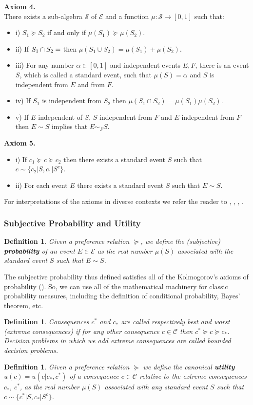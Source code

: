 \documentclass[11pt]{article}
\theoremstyle{plain}
\newtheorem{defi}[teo]{Definition}
\begin{document}
	\textbf{Axiom 4.}\\
	There exists a sub-algebra $\mathcal{S}$ of $\mathcal{E}$ and a function $\mu : \mathcal{S} \to [0,1]$ such that:
	\begin{itemize}
	\item i) $S_1 \succeq S_2$ if and only if $\mu(S_1) \succeq \mu(S_2)$.
	\item ii) If $S_1 \cap S_2 = \empty$ then $\mu(S_1 \cup S_2) = \mu(S_1) + \mu(S_2)$.
	\item iii) For any number $\alpha \in [0,1]$ and independent events $E,F$, there is an event $S$, which is called a standard event, such that $\mu(S)=\alpha$ and $S$ is independent from $E$ and from $F$.
	\item iv) If $S_1$ is independent from $S_2$ then $\mu(S_1 \cap S_2)=\mu(S_1)\mu(S_2)$.
	\item v) If $E$ independent of $S$, $S$ independent from $F$ and $E$ independent from $F$ then $E \sim S$ implies that $E \sim_F S$.
	\end{itemize}
	
	\textbf{Axiom 5.}
	\begin{itemize}
	\item i) If $c_1 \succeq c \succeq c_2$ then there exists a standard event $S$ such that $c \sim \{ c_2 | S, c_1 | S^c \}$.
	\item ii) For each event $E$ there exists a standard event $S$ such that $E \sim S$.
	\end{itemize}
	
	For interpretations of the axioms in diverse contexts we refer the reader to \cite{bernardo2000bayesian}, \cite{binmore2008rational}, \cite{gilboa2009decision}, \cite{wakker2010prospect}.
	\subsubsection{Subjective Probability and Utility}
	\begin{defi}
	Given a preference relation $\succeq$, we define the (subjective) \textbf{probability} of an event $E \in \mathcal{E}$ as the real number $\mu(S)$ associated with the standard event $S$ such that $E \sim S$.
	\end{defi}
	The subjective probability thus defined satisfies all of the Kolmogorov's axioms of probability (\cite{bernardo2000bayesian}). So, we can use all of the mathematical machinery for classic probability measures, including the definition of conditional probability, Bayes' theorem, etc.
	\begin{defi}
	Consequences $c^\ast$ and $c_\ast$ are called respectively best and worst (extreme consequences) if for any other consequence $c \in \mathcal{C}$ then $c^\ast \succeq c \succeq c_\ast$. Decision problems in which we add extreme consequences are called bounded decision problems.
	\end{defi}
	\begin{defi}
	Given a preference relation $\succeq$ we define the canonical \textbf{utility} $u(c)=u(c | c_\ast, c^\ast)$ of a consequence $c \in \mathcal{C}$ relative to the extreme consequences $c_\ast$, $c^\ast$, as the real number $\mu(S)$ associated with any standard event $S$ such that $c \sim \{c^\ast | S, c_\ast | S^c\}$.
	\end{defi}
\end{document}
